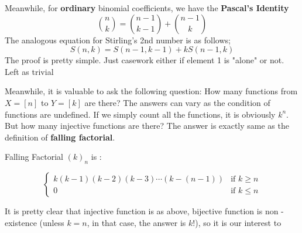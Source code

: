 \documentclass[12pt]{article}
\begin{document}
Meanwhile, for \textbf{ordinary} binomial coefficients, we have the \textbf{Pascal's Identity}
\[
\binom{n}{k} = \binom{n-1}{k-1} + \binom{n-1}{k}
\]
The analogous equation for Stirling's 2nd number is as follows;
\[
S(n,k) = S(n-1,k-1) + kS(n-1,k)
\]
The proof is pretty simple. Just casework either if element 1 is "alone" or not. Left as trivial

Meanwhile, it is valuable to ask the following question: How many functions from $X = [n]$ to $Y = [k] $ are there? The answers can vary as the condition of functions are undefined. If we simply count all the functions, it is obviously $k^n$. But how many injective functions are there? The answer is exactly same as the definition of \textbf{falling factorial}.

\begin{description}
  \item[Falling Factorial $(k)_n$ is :]
\end{description}
\[
\begin{cases}
  k(k-1)(k-2)(k-3) \cdots (k-(n-1)) &\text{if } k \geq n \\
  0 &\text{if } k \leq n
\end{cases}
\]

It is pretty clear that injective function is as above, bijective function is non - existence (unless $k = n$, in that case, the answer is $k!$), so it is our interest to
\end{document}
